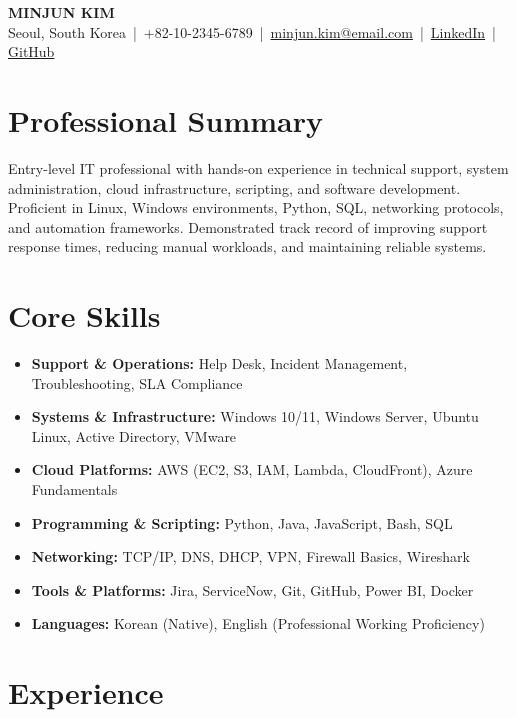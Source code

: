 \documentclass[a4paper,10pt]{article}
\begin{document}
\begin{center}
    {\huge \textbf{MINJUN KIM}} \\[0.2cm]
    Seoul, South Korea \,|\, +82-10-2345-6789 \,|\,
    \href{mailto:minjun.kim@email.com}{minjun.kim@email.com} \,|\,
    \href{https://linkedin.com/in/minjunkim}{LinkedIn} \,|\,
    \href{https://github.com/minjunkim}{GitHub}
\end{center}

\section*{Professional Summary}
Entry-level IT professional with hands-on experience in technical support, system administration, cloud infrastructure, scripting, and software development. Proficient in Linux, Windows environments, Python, SQL, networking protocols, and automation frameworks. Demonstrated track record of improving support response times, reducing manual workloads, and maintaining reliable systems.

\section*{Core Skills}
\begin{itemize}[leftmargin=*,nosep]
    \item \textbf{Support \& Operations:} Help Desk, Incident Management, Troubleshooting, SLA Compliance
    \item \textbf{Systems \& Infrastructure:} Windows 10/11, Windows Server, Ubuntu Linux, Active Directory, VMware
    \item \textbf{Cloud Platforms:} AWS (EC2, S3, IAM, Lambda, CloudFront), Azure Fundamentals
    \item \textbf{Programming \& Scripting:} Python, Java, JavaScript, Bash, SQL
    \item \textbf{Networking:} TCP/IP, DNS, DHCP, VPN, Firewall Basics, Wireshark
    \item \textbf{Tools \& Platforms:} Jira, ServiceNow, Git, GitHub, Power BI, Docker
    \item \textbf{Languages:} Korean (Native), English (Professional Working Proficiency)
\end{itemize}

\section*{Experience}
\end{document}
